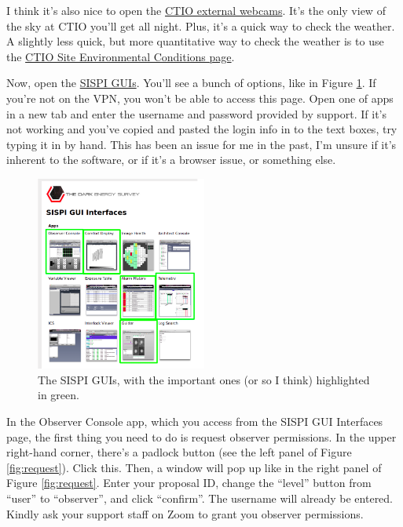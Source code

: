 I think it's also nice to open the \href{http://www.ctio.noao.edu/noao/content/ctio-external-webcam}{CTIO external webcams}. It's the only view of the sky at CTIO you'll get all night. Plus, it's a quick way to check the weather. A slightly less quick, but more quantitative way to check the weather is to use the \href{https://noirlab.edu/science/observing-noirlab/weather-webcams/cerro-tololo/environmental-conditions}{CTIO Site Environmental Conditions page}.\\
\par
Now, open the \href{http://system1.ctio.noao.edu:7001/apps/}{SISPI GUIs}. You'll see a bunch of options, like in Figure \ref{fig:sispi}. If you're not on the VPN, you won't be able to access this page. Open one of apps in a new tab and enter the username and password provided by support. If it's not working and you've copied and pasted the login info in to the text boxes, try typing it in by hand. This has been an issue for me in the past, I'm unsure if it's inherent to the software, or if it's a browser issue, or something else. \\ 

\begin{figure}
    \centering
    \includegraphics[width=0.5\textwidth]{figs/observing/sispi.png}
    \caption{The SISPI GUIs, with the important ones (or so I think) highlighted in green.}
    \label{fig:sispi}
\end{figure}

In the Observer Console app, which you access from the SISPI GUI Interfaces page, the first thing you need to do is request observer permissions. In the upper right-hand corner, there's a padlock button (see the left panel of Figure \ref{fig:request}). Click this. Then, a window will pop up like in the right panel of Figure \ref{fig:request}. Enter your proposal ID, change the ``level'' button from ``user'' to ``observer'', and click ``confirm''. The username will already be entered. Kindly ask your support staff on Zoom to grant you observer permissions. \\

